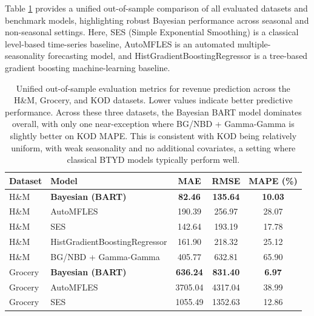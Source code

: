 \documentclass[11pt]{amsart}
\theoremstyle{definition}
\begin{document}
Table \ref{tab:unified_dataset_metrics} provides a unified out-of-sample comparison of all evaluated datasets and benchmark models,
highlighting robust Bayesian performance across seasonal and non-seasonal settings.
Here, SES (Simple Exponential Smoothing) is a classical level-based time-series baseline, AutoMFLES is an automated
multiple-seasonality forecasting model, and HistGradientBoostingRegressor is a tree-based gradient boosting machine-learning baseline.

\begin{table}[H]
    \centering
\caption{Unified out-of-sample evaluation metrics for revenue prediction across the H\&M, Grocery, and KOD datasets.
        Lower values indicate better predictive performance. Across these three datasets, the Bayesian BART model
        dominates overall, with only one near-exception where BG/NBD + Gamma-Gamma is slightly better on KOD MAPE.
        This is consistent with KOD being relatively uniform, with weak seasonality and no additional covariates,
        a setting where classical BTYD models typically perform well.}
    \label{tab:unified_dataset_metrics}
    \begin{tabular}{llccc}
        \hline
        \textbf{Dataset} & \textbf{Model}                & \textbf{MAE} & \textbf{RMSE} & \textbf{MAPE (\%)} \\
        \hline
        H\&M             & \textbf{Bayesian (BART)}      & \textbf{82.46}        & \textbf{135.64}        & \textbf{10.03}              \\
        H\&M             & AutoMFLES                     & 190.39       & 256.97        & 28.07              \\
        H\&M             & SES                           & 142.64       & 193.19        & 17.78              \\
        H\&M             & HistGradientBoostingRegressor & 161.90       & 218.32        & 25.12              \\
        H\&M             & BG/NBD + Gamma-Gamma          & 405.77       & 632.81        & 65.90              \\
        \hline
        Grocery          & \textbf{Bayesian (BART)}      & \textbf{636.24}       & \textbf{831.40}        & \textbf{6.97}               \\
        Grocery          & AutoMFLES                     & 3705.04      & 4317.04       & 38.99              \\
        Grocery          & SES                           & 1055.49      & 1352.63       & 12.86              \\

\end{tabular}
\end{table}
\end{document}
